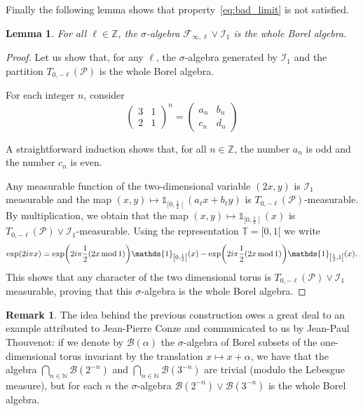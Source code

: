 \documentclass[10pt]{amsart}
\newtheorem{lemm}[theo]{Lemma}\newtheorem{prop}[theo]{Proposition}\newtheorem{coro}[theo]{Corollary}\newtheorem{conj}[theo]{Conjecture}
\theoremstyle{definition}\newtheorem{defi}[theo]{Definition}\newtheorem{rema}[theo]{Remark}\newtheorem{exam}[theo]{Example}\newtheorem{exem}[theo]{Example}\newtheorem{nota}[theo]{Notation}
\DeclareMathOperator{\modd}{mod}
\newcommand{\bbT}{\mathbb{T}}
\newcommand{\Z}{\mathbb{Z}}
\newcommand*\N{\mathbb{N}}
\newcommand*\I{\mathcal{I}}
\newcommand*\B{\mathcal{B}}
\newcommand*\F{\mathcal{F}}
\renewcommand*\P{\mathcal{P}}
\newcommand{\ind}[1]{{\mathds{1}}_{#1}}
\let\originalleft\left
\let\originalright\right
\renewcommand{\left}{\mathopen{}\mathclose\bgroup\originalleft}
\renewcommand{\right}{\aftergroup\egroup\originalright}
\begin{document}
Finally the following lemma shows that property~\eqref{eq:bad_limit} is not satisfied.

\begin{lemm}
For all $\ell\in\Z$, the $\sigma$-algebra $\F_{\infty,\ell}\vee\I_1$ is the whole Borel algebra.
\end{lemm}

\begin{proof}
Let us show that, for any $\ell$, the $\sigma$-algebra generated by $\I_1$ and the partition $T_{0,-\ell}(\P)$ is the whole Borel algebra.

For each integer $n$, consider
\[
\begin{pmatrix}3&1\\2&1
\end{pmatrix}^n=
\begin{pmatrix}a_n&b_n\\c_n&d_n
\end{pmatrix}
\]

A straightforward induction shows that, for all $n\in\Z$, the number $a_n$ is odd and the number $c_n$ is even.

Any measurable function of the two-dimensional variable $(2x,y)$ is $\I_1$ measurable and the map $(x,y)\mapsto\ind{[0,\frac12\mathclose{[}}(a_\ell x+b_\ell y)$ is $T_{0,-\ell }(\P)$-measurable. By multiplication, we obtain that the map $(x,y)\mapsto\ind{[0,\frac12\mathclose{[}}(x)$ is $T_{0,-\ell }(\P)\vee\I_1$-measurable. Using the representation $\bbT=[0,1[$ we write
\[
\exp(2i\pi x)=\exp\left(2i\pi\frac12(2x\modd 1)\right)\ind{\left[0,\frac12\right[}(x)-\exp\left(2i\pi\frac12(2x\modd 1)\right)\ind{\left[\frac12,1\right[}(x).
\]
This shows that any character of the two dimensional torus is $T_{0,-\ell }(\P)\vee\I_1$ measurable, proving that this $\sigma$-algebra is the whole Borel algebra.
\end{proof}
\begin{rema}
The idea behind the previous construction owes a great deal to an example attributed to Jean-Pierre Conze and communicated to us by Jean-Paul Thouvenot: if we denote by $\B(\alpha)$ the $\sigma$-algebra of Borel subsets of the one-dimensional torus invariant by the translation $x\mapsto x+\alpha$, we have that the algebra $
\bigcap_{n\in\N}\B(2^{-n})$ and $\bigcap_{n\in\N}\B(3^{-n}) $ are trivial (modulo the Lebesgue measure), but for each $n$ the $\sigma$-algebra $
\B(2^{-n})\vee\B(3^{-n}) $ is the whole Borel algebra.
\end{rema}
\end{document}
